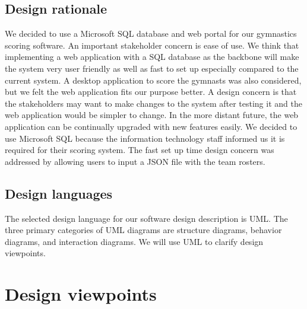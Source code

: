 \documentclass[letterpaper,10pt,draftclsnofoot,onecolumn,]{article}
\begin{document}
\subsection{Design rationale}
We decided to use a Microsoft SQL database and web portal for our gymnastics scoring software. An important stakeholder concern is ease of use. We think that implementing a web application with a SQL database as the backbone will make the system very user friendly as well as fast to set up especially compared to the current system. A desktop application to score the gymnasts was also considered, but we felt the web application fits our purpose better. A design concern is that the stakeholders may want to make changes to the system after testing it and the web application would be simpler to change. In the more distant future, the web application can be continually upgraded with new features easily. We decided to use Microsoft SQL because the information technology staff informed us it is required for their scoring system. The fast set up time design concern was addressed by allowing users to input a JSON file with the team rosters.
\subsection{Design languages}
The selected design language for our software design description is UML. The three primary categories of UML diagrams are structure diagrams, behavior diagrams, and interaction diagrams. We will use UML to clarify design viewpoints. 

\section{Design viewpoints}
\end{document}
